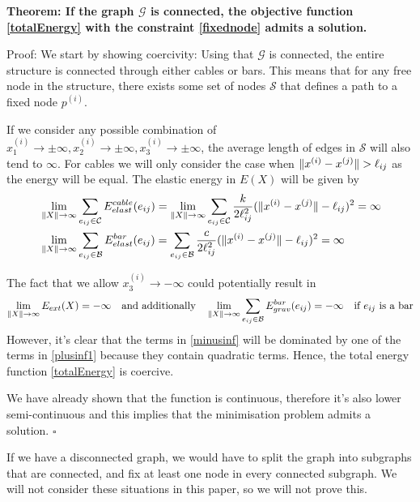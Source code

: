 \textbf{Theorem: If the graph $\mathcal{G}$ is connected, the objective function \eqref{totalEnergy} with the constraint \eqref{fixednode} admits a solution.}

Proof:
We start by showing coercivity:
Using that $\mathcal{G}$ is connected, the entire structure is connected through either cables or bars. This means that for any free node in the structure, there exists some set of nodes $\mathcal{S}$ that defines a path to a fixed node $p^{(i)}$. 

If we consider any possible combination of $x^{(i)}_1 \to \pm \infty,x^{(i)}_2 \to \pm \infty,x^{(i)}_3 \to \pm \infty$, the average length of edges in $\mathcal{S}$ will also tend to $\infty$. For cables we will only consider the case when $\lVert x^{(i)} - x^{(j)}\rVert > \ell_{ij}$ as the energy will be equal. The elastic energy in $E(X)$ will be given by
\begin{equation} 
\label{plusinf1}
\begin{aligned}
     &\lim\limits_{\rVert X \lVert \to \infty} \sum\limits_{e_{ij} \in \mathcal{C}}E^{cable}_{elast}(e_{ij}) =\lim\limits_{\rVert X \lVert \to \infty} \sum\limits_{e_{ij} \in \mathcal{C}} \frac{k}{2 \ell_{ij} ^2}(\lVert x^{(i)} - x^{(j)} \rVert-\ell_{ij})^2 = \infty \\
     &\lim\limits_{\rVert X \lVert \to \infty} \sum\limits_{e_{ij} \in \mathcal{B }}E^{bar}_{elast}(e_{ij}) = 
      \sum\limits_{e_{ij} \in \mathcal{B}} \frac{c}{2 \ell_{ij} ^2}(\lVert x^{(i)} - x^{(j)} \rVert-\ell_{ij})^2 = \infty
\end{aligned} 
\end{equation}

The fact that we allow $x^{(i)}_3 \to -\infty$ could potentially result in
\begin{equation}
  \lim\limits_{\rVert X \lVert \to \infty} E_{ext}(X) = -\infty
\quad\text{and additionally}\quad
\lim\limits_{\rVert X \lVert \to \infty} \sum\limits_{e_{ij} \in \mathcal{B}} E^{bar}_{grav}(e_{ij}) = -\infty \quad \text{if $e_{ij}$ is a bar}
\label{minusinf}
\end{equation} 
However, it's clear that the terms in \eqref{minusinf} will be dominated by one of the terms in \eqref{plusinf1} because they contain quadratic terms. Hence, the total energy function \eqref{totalEnergy} is coercive.

We have already shown that the function is continuous, therefore it's also lower semi-continuous and this implies that the minimisation problem admits a solution. \hfill $\square$

If we have a disconnected graph, we would have to split the graph into subgraphs that are connected, and fix at least one node in every connected subgraph. We will not consider these situations in this paper, so we will not prove this.

